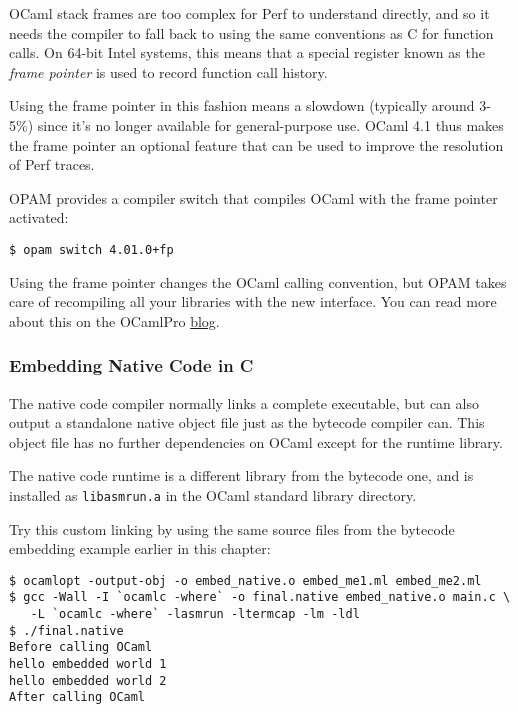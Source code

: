 OCaml stack frames are too complex for Perf to understand directly, and
so it needs the compiler to fall back to using the same conventions as C
for function calls. On 64-bit Intel systems, this means that a special
register known as the \emph{frame pointer} is used to record function
call history.

Using the frame pointer in this fashion means a slowdown (typically
around 3-5\%) since it's no longer available for general-purpose use.
OCaml 4.1 thus makes the frame pointer an optional feature that can be
used to improve the resolution of Perf traces.

OPAM provides a compiler switch that compiles OCaml with the frame
pointer activated:

\begin{lstlisting}
$ opam switch 4.01.0+fp
\end{lstlisting}

Using the frame pointer changes the OCaml calling convention, but OPAM
takes care of recompiling all your libraries with the new interface. You
can read more about this on the OCamlPro
\href{http://www.ocamlpro.com/blog/2012/08/08/profile-native-code.html}{blog}.

\hypertarget{embedding-native-code-in-c}{%
\subsubsection{Embedding Native Code in
C}\label{embedding-native-code-in-c}}

The native code compiler normally links a complete executable, but can
also output a standalone native object file just as the bytecode
compiler can. This object file has no further dependencies on OCaml
except for the runtime
library.

The native code runtime is a different library from the bytecode one,
and is installed as \passthrough{\lstinline!libasmrun.a!} in the OCaml
standard library directory.

Try this custom linking by using the same source files from the bytecode
embedding example earlier in this chapter:

\begin{lstlisting}
$ ocamlopt -output-obj -o embed_native.o embed_me1.ml embed_me2.ml
$ gcc -Wall -I `ocamlc -where` -o final.native embed_native.o main.c \
   -L `ocamlc -where` -lasmrun -ltermcap -lm -ldl
$ ./final.native
Before calling OCaml
hello embedded world 1
hello embedded world 2
After calling OCaml
\end{lstlisting}

